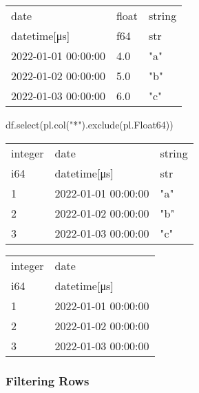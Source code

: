 \documentclass[
  letterpaper,
  DIV=11,
  numbers=noendperiod]{scrartcl}
\newenvironment{Shaded}{\begin{snugshade}}{\end{snugshade}}
\newcommand{\CommentTok}[1]{\textcolor[rgb]{0.37,0.37,0.37}{#1}}
\newcommand{\NormalTok}[1]{\textcolor[rgb]{0.00,0.23,0.31}{#1}}
\newcommand{\StringTok}[1]{\textcolor[rgb]{0.13,0.47,0.30}{#1}}
\begin{document}
\begin{longtable}[]{@{}lll@{}}
\toprule()
date & float & string \\
datetime{[}μs{]} & f64 & str \\
\midrule()
\endhead
2022-01-01 00:00:00 & 4.0 & "a" \\
2022-01-02 00:00:00 & 5.0 & "b" \\
2022-01-03 00:00:00 & 6.0 & "c" \\
\bottomrule()
\end{longtable}

\begin{Shaded}
\begin{Highlighting}[]
\NormalTok{df.select(pl.col(}\StringTok{"*"}\NormalTok{).exclude(pl.Float64))}
\end{Highlighting}
\end{Shaded}

\begin{longtable}[]{@{}lll@{}}
\toprule()
integer & date & string \\
i64 & datetime{[}μs{]} & str \\
\midrule()
\endhead
1 & 2022-01-01 00:00:00 & "a" \\
2 & 2022-01-02 00:00:00 & "b" \\
3 & 2022-01-03 00:00:00 & "c" \\
\bottomrule()
\end{longtable}

\begin{Shaded}
\end{Shaded}

\begin{longtable}[]{@{}ll@{}}
\toprule()
integer & date \\
i64 & datetime{[}μs{]} \\
\midrule()
\endhead
1 & 2022-01-01 00:00:00 \\
2 & 2022-01-02 00:00:00 \\
3 & 2022-01-03 00:00:00 \\
\bottomrule()
\end{longtable}

\hypertarget{filtering-rows}{%
\subsubsection{Filtering Rows}\label{filtering-rows}}
\end{document}

